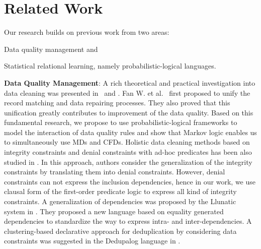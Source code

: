 \section{Related Work}
\label{sec:related}

Our research builds on previous work from two areas: 
\begin{inparaenum}[\itshape 1\upshape)]
\item Data quality management and
\item Statistical relational learning, namely probabilistic-logical languages.
\end{inparaenum}

\textbf{Data Quality Management}: A rich theoretical and practical investigation into data cleaning was presented in~\cite{Fan:2014:IRM:2628135.2567657} and \cite{fellegi1976systematic}. Fan W. et al.~\cite{Fan:2011:IRM:1989323.1989373} first proposed to unify the record matching and data repairing processes. They also proved that this unification greatly contributes to improvement of the data quality. Based on this fundamental research, we propose to use probabilistic-logical frameworks to model the interaction of data quality rules and show that Markov logic enables us to simultaneously use MDs and CFDs. Holistic data cleaning methods based on integrity constraints and denial constraints with ad-hoc predicates has been also studied in \cite{chu2013holistic}. In this approach, authors consider the generalization of the integrity constraints by translating them into denial constraints. However, denial constraints can not express the inclusion dependencies, hence in our work, we use clausal form of the first-order predicate logic to express all kind of integrity constraints. A generalization of dependencies was proposed by the Llunatic system in \cite{llunaticVDLB2013b}. They proposed a new language based on equality generated dependencies to standardize the way to express intra- and inter-dependencies. A clustering-based declarative approach for deduplication by considering data constraints was suggested in the Dedupalog language in \cite{Arasu:2009:LDC:1546683.1547340}.


